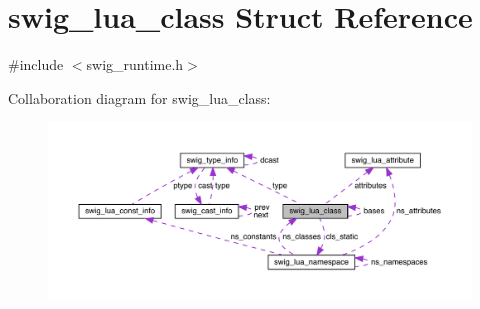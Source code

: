 \hypertarget{structswig__lua__class}{}\section{swig\+\_\+lua\+\_\+class Struct Reference}
\label{structswig__lua__class}


{\ttfamily \#include $<$swig\+\_\+runtime.\+h$>$}



Collaboration diagram for swig\+\_\+lua\+\_\+class\+:\nopagebreak
\begin{figure}[H]
\begin{center}
\leavevmode
\includegraphics[width=350pt]{structswig__lua__class__coll__graph}
\end{center}
\end{figure}
